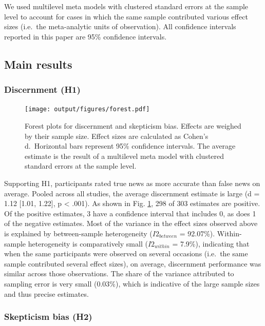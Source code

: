 \documentclass[
  doc,floatsintext]{apa6}
\begin{document}
We used multilevel meta models with clustered standard errors at the sample level to account for cases in which the same sample contributed various effect sizes (i.e.~the meta-analytic units of observation). All confidence intervals reported in this paper are 95\% confidence intervals.

\subsection{Main results}\label{main-results}

\subsubsection{Discernment (H1)}\label{discernment-h1}



\begin{figure}
\centering
\texttt{[image: output/figures/forest.pdf]}
\caption{\label{fig:forest}Forest plots for discernment and skepticism bias. Effects are weighed by their sample size. Effect sizes are calculated as Cohen's d.~Horizontal bars represent 95\% confidence intervals. The average estimate is the result of a multilevel meta model with clustered standard errors at the sample level.}
\end{figure}

Supporting H1, participants rated true news as more accurate than false news on average. Pooled across all studies, the average discernment estimate is large (d = 1.12 {[}1.01, 1.22{]}, p \textless{} .001). As shown in Fig. \ref{fig:forest}, 298 of 303 estimates are positive. Of the positive estimates, 3 have a confidence interval that includes 0, as does 1 of the negative estimates. Most of the variance in the effect sizes observed above is explained by between-sample heterogeneity (\(I2_{between}\) = 92.07\%). Within-sample heterogeneity is comparatively small (\(I2_{within}\) = 7.9\%), indicating that when the same participants were observed on several occasions (i.e.~the same sample contributed several effect sizes), on average, discernment performance was similar across those observations. The share of the variance attributed to sampling error is very small (0.03\%), which is indicative of the large sample sizes and thus precise estimates.

\subsubsection{Skepticism bias (H2)}\label{skepticism-bias-h2}
\end{document}
